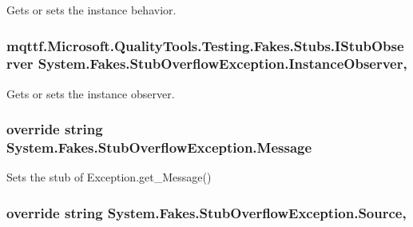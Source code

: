Gets or sets the instance behavior.

\hypertarget{class_system_1_1_fakes_1_1_stub_overflow_exception_a1a91c51318c1a88ba998730b45496069}{
\subsubsection[{Instance\-Observer}]{\setlength{\rightskip}{0pt plus 5cm}mqttf.\-Microsoft.\-Quality\-Tools.\-Testing.\-Fakes.\-Stubs.\-I\-Stub\-Observer System.\-Fakes.\-Stub\-Overflow\-Exception.\-Instance\-Observer\hspace{0.3cm}{\ttfamily [get]}, {\ttfamily [set]}}}\label{class_system_1_1_fakes_1_1_stub_overflow_exception_a1a91c51318c1a88ba998730b45496069}


Gets or sets the instance observer.

\hypertarget{class_system_1_1_fakes_1_1_stub_overflow_exception_aaf6393e74028d8e0ab7286f15c61677e}{
\subsubsection[{Message}]{\setlength{\rightskip}{0pt plus 5cm}override string System.\-Fakes.\-Stub\-Overflow\-Exception.\-Message\hspace{0.3cm}{\ttfamily [get]}}}\label{class_system_1_1_fakes_1_1_stub_overflow_exception_aaf6393e74028d8e0ab7286f15c61677e}


Sets the stub of Exception.\-get\-\_\-\-Message()

\hypertarget{class_system_1_1_fakes_1_1_stub_overflow_exception_adc9cf58e66319667b27af6d962e98f44}{
\subsubsection[{Source}]{\setlength{\rightskip}{0pt plus 5cm}override string System.\-Fakes.\-Stub\-Overflow\-Exception.\-Source\hspace{0.3cm}{\ttfamily [get]}, {\ttfamily [set]}}}\label{class_system_1_1_fakes_1_1_stub_overflow_exception_adc9cf58e66319667b27af6d962e98f44}


